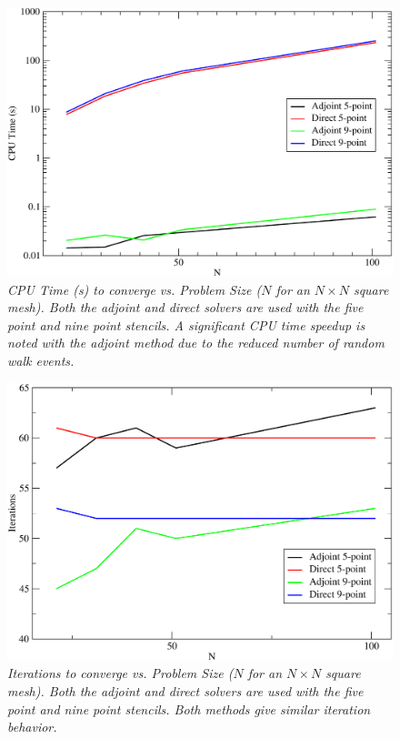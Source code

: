 \documentclass[preprint,12pt]{elsarticle}
\begin{document}
\begin{figure}[h!]
  \centering
  \includegraphics[width=5in,clip]{Adjoint_Direct_CPU_Time.pdf}
  \caption{\sl CPU Time (s) to converge vs. Problem Size ($N$ for an
    $N \times N$ square mesh). Both the adjoint and direct solvers are
    used with the five point and nine point stencils. A significant
    CPU time speedup is noted with the adjoint method due to the
    reduced number of random walk events.}
  \label{fig:poisson_cpu_time}
\end{figure}

\begin{figure}[h!]
  \centering
  \includegraphics[width=5in,clip]{Adjoint_Direct_Iterations.pdf}
  \caption{\sl Iterations to converge vs. Problem Size ($N$ for an $N
    \times N$ square mesh). Both the adjoint and direct solvers are
    used with the five point and nine point stencils. Both methods
    give similar iteration behavior.}
  \label{fig:poisson_iterations}
\end{figure}
\end{document}
